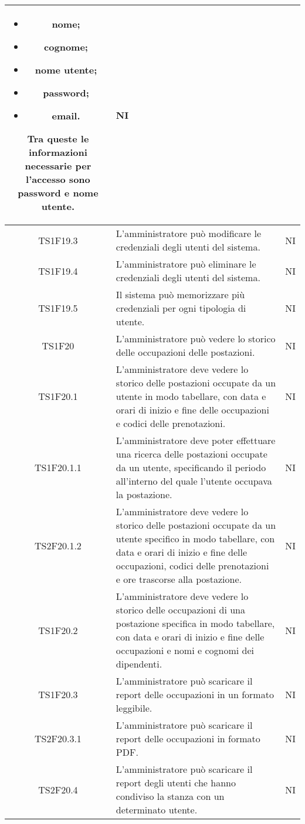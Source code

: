 \begin{center}
\begin{longtable}{|c|p{10cm}|c|}
\begin{itemize}
				\item nome;
				\item cognome;
				\item nome utente;
				\item password;
				\item email.
			\end{itemize}
			Tra queste le informazioni necessarie per l’accesso sono password e nome utente. & NI \\	
			\hline
			TS1F19.3 & L’amministratore può modificare le credenziali degli utenti del sistema. & NI \\	
			\hline
			TS1F19.4 & L’amministratore può eliminare le credenziali degli utenti del sistema. & NI \\	
			\hline
			TS1F19.5 & Il sistema può memorizzare più credenziali per ogni tipologia di utente. & NI \\	
			\hline
			TS1F20 & L'amministratore può vedere lo storico delle occupazioni delle postazioni. & NI \\	
			\hline
			TS1F20.1 & L'amministratore deve vedere lo storico delle postazioni occupate da un utente in modo tabellare, con data e orari di inizio e fine delle occupazioni e codici delle prenotazioni. & NI \\	
			\hline
			TS1F20.1.1 & L'amministratore deve poter effettuare una ricerca delle postazioni occupate da un utente, specificando il periodo all'interno del quale l'utente occupava la postazione. & NI \\	
			\hline
			TS2F20.1.2 & L'amministratore deve vedere lo storico delle postazioni occupate da un utente specifico in modo tabellare, con data e orari di inizio e fine delle occupazioni, codici delle prenotazioni e ore trascorse alla postazione. & NI \\	
			\hline
			TS1F20.2 & L'amministratore deve vedere lo storico delle occupazioni di una postazione specifica in modo tabellare, con data e orari di inizio e fine delle occupazioni e nomi e cognomi dei dipendenti. & NI \\			
			\hline
			TS1F20.3 & L'amministratore può scaricare il report delle occupazioni in un formato leggibile. & NI \\		
			\hline
			TS2F20.3.1 & L'amministratore può scaricare il report delle occupazioni in formato PDF. & NI \\		
			\hline			
			TS2F20.4 & L'amministratore può scaricare il report degli utenti che hanno condiviso la stanza con un determinato utente. & NI \\		

\end{longtable}
\end{center}
